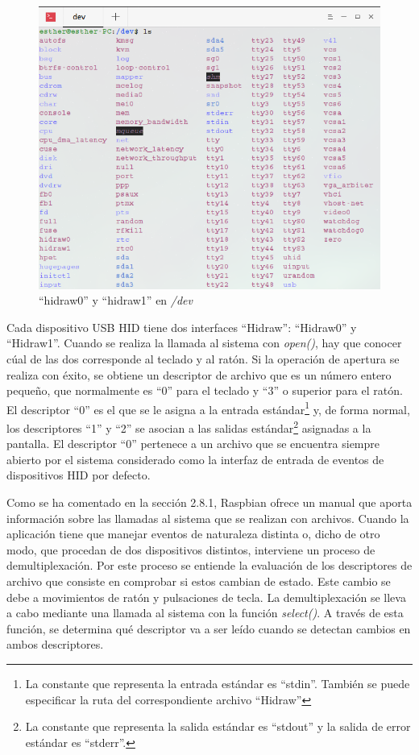 \begin{figure}[H]
\centering
\includegraphics[scale = 0.4]{capitulo_03/figuras_dir/dev.jpg}
\caption{``hidraw0'' y ``hidraw1'' en {\itshape /dev}}
\end{figure}

Cada dispositivo USB HID tiene dos interfaces ``Hidraw'': ``Hidraw0'' y ``Hidraw1''. Cuando se realiza la llamada al sistema con {\itshape open()}, hay que conocer cúal de las dos corresponde al teclado y al ratón. Si la operación de apertura se realiza con éxito, se obtiene un descriptor de archivo que es un número entero pequeño, que normalmente es ``0'' para el teclado y ``3'' o superior para el ratón. El descriptor ``0'' es el que se le asigna a la  entrada estándar\footnote{La constante que representa la entrada estándar es ``stdin''. También se puede especificar la ruta del correspondiente archivo ``Hidraw''} y, de forma normal, los descriptores ``1'' y ``2'' se asocian a las salidas estándar\footnote{La constante que representa la salida estándar es ``stdout'' y la salida de error estándar es ``stderr''.} asignadas a la pantalla. El descriptor ``0'' pertenece a un archivo que se encuentra siempre abierto por el sistema considerado como la interfaz de entrada de eventos de dispositivos HID por defecto.

Como se ha comentado en la sección 2.8.1, Raspbian ofrece un manual que aporta información sobre las llamadas al sistema que se realizan con archivos. Cuando la aplicación tiene que manejar eventos de naturaleza distinta o, dicho de otro modo, que procedan de dos dispositivos distintos, interviene un proceso de demultiplexación. Por este proceso se entiende la evaluación de los descriptores de archivo que consiste en comprobar si estos cambian de estado. Este cambio se debe a movimientos de ratón y pulsaciones de tecla. La demultiplexación se lleva a cabo mediante una llamada al sistema con la función {\itshape select()}. A través de esta función, se determina qué descriptor va a ser leído cuando se detectan cambios en ambos descriptores.

